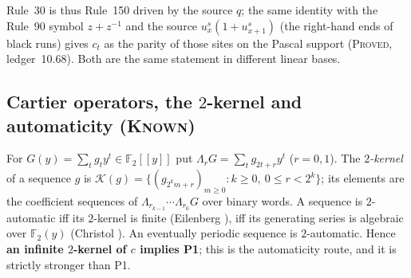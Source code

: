 \documentclass[11pt]{article}
\theoremstyle{definition}
\theoremstyle{remark}
\newcommand{\F}{\mathbb{F}_2}
\newcommand{\PROVED}{\textsc{Proved}}
\newcommand{\KNOWN}{\textsc{Known}}
\begin{document}
Rule~30 is thus Rule~150 driven by the source $q$; the same identity with the Rule~90 symbol $z+z^{-1}$ and the source $u^s_x(1+u^s_{x+1})$ (the right-hand ends of black runs) gives $c_t$ as the parity of those sites on the Pascal support (\PROVED, ledger~10.68). Both are the same statement in different linear bases.

\subsection*{Cartier operators, the \texorpdfstring{$2$}{2}-kernel and automaticity (\KNOWN)}
For $G(y)=\sum_tg_ty^t\in\F[[y]]$ put $\Lambda_rG=\sum_tg_{2t+r}y^t$ ($r=0,1$). The \emph{$2$-kernel} of a sequence $g$ is $\mathcal K(g)=\{(g_{2^km+r})_{m\ge0}:k\ge0,\ 0\le r<2^k\}$; its elements are the coefficient sequences of $\Lambda_{r_{k-1}}\cdots\Lambda_{r_0}G$ over binary words. A sequence is $2$-automatic iff its $2$-kernel is finite (Eilenberg \cite{Eilenberg}), iff its generating series is algebraic over $\F(y)$ (Christol \cite{CKMFR}). An eventually periodic sequence is $2$-automatic. Hence \textbf{an infinite $2$-kernel of $c$ implies P1}; this is the automaticity route, and it is strictly stronger than P1.
\end{document}
